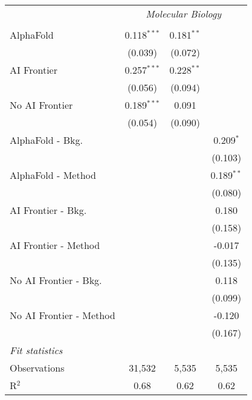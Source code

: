 \begin{tabular}{lccc}
 & \multicolumn{3}{c}{\textit{Molecular Biology}} \\ \\
   AlphaFold               & 0.118$^{***}$ & 0.181$^{**}$ &   \\   
                           & (0.039)       & (0.072)      &   \\   
   AI Frontier             & 0.257$^{***}$ & 0.228$^{**}$ &   \\   
                           & (0.056)       & (0.094)      &   \\   
   No AI Frontier          & 0.189$^{***}$ & 0.091        &   \\   
                           & (0.054)       & (0.090)      &   \\   
   AlphaFold - Bkg.        &               &              & 0.209$^{*}$\\   
                           &               &              & (0.103)\\   
   AlphaFold - Method      &               &              & 0.189$^{**}$\\   
                           &               &              & (0.080)\\   
   AI Frontier - Bkg.      &               &              & 0.180\\   
                           &               &              & (0.158)\\   
   AI Frontier - Method    &               &              & -0.017\\   
                           &               &              & (0.135)\\   
   No AI Frontier - Bkg.   &               &              & 0.118\\   
                           &               &              & (0.099)\\   
   No AI Frontier - Method &               &              & -0.120\\   
                           &               &              & (0.167)\\   
   \midrule
   \emph{Fit statistics}\\
   Observations            & 31,532        & 5,535        & 5,535\\  
   R$^2$                   & 0.68          & 0.62         & 0.62\\  
   

\end{tabular}
